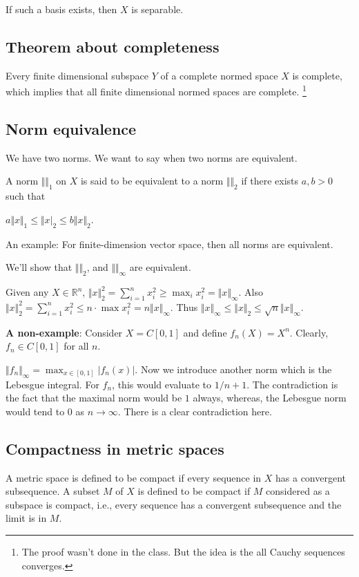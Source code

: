 \documentclass[11pt]{article}
\def\R{\mathbb{R}}
\begin{document}
If such a basis exists, then \(X\) is separable.
\subsection{Theorem about completeness}
\label{sec:org27fa49e}
Every finite dimensional subspace \(Y\) of a complete normed space \(X\) is
complete, which implies that all finite dimensional normed spaces are
complete. \footnote{The proof wasn't done in the class. But the idea is the all Cauchy
sequences converges.}
\subsection{Norm equivalence}
\label{sec:org42c378b}
We have two norms. We want to say when two norms are equivalent.

A norm \(\Vert \Vert_1\) on \(X\) is said to be equivalent to a norm \(\Vert
   \Vert_2\) if there exists \(a, b > 0\) such that

\(a \Vert x \Vert_1 \le \Vert x \vert_2 \le b \Vert x \Vert_2\).

An example: For finite-dimension vector space, then all norms are equivalent.

We'll show that \(\Vert \Vert_2\), and \(\Vert \Vert_\infty\) are equivalent.

Given any \(X \in \R^n\), \(\Vert x\Vert_2^2 = \sum_{i=1}^{n} x_i^2 \ge \max_i
   x_i^2 = \Vert x\Vert_\infty\). Also \(\Vert x \Vert_2^2 = \sum_{i=1}^{n} x_i^2
   \le n \cdot \max x_i^2 = n \Vert x \Vert_\infty\). Thus \(\Vert x \Vert_\infty
   \le \Vert x\Vert_2 \le \sqrt{n}\Vert x \Vert_\infty\).

\textbf{A non-example}: Consider \(X = C[0, 1]\) and define \(f_n(X) = X^n\). Clearly,
\(f_n \in C[0, 1]\) for all \(n\).

\(\Vert f_n \Vert_\infty = \max_{x\in [0, 1]} \vert f_n(x)\vert\). Now we
introduce another norm which is the Lebesgue integral. For \(f_n\), this would
evaluate to \(1/{n+1}\). The contradiction is the fact that the maximal norm
would be \(1\) always, whereas, the Lebesgue norm would tend to \(0\) as
\(n\rightarrow \infty\). There is a clear contradiction here.
\subsection{Compactness in metric spaces}
\label{sec:orgae819b0}
A metric space is defined to be compact if every sequence in \(X\) has a
convergent subsequence. A subset \(M\) of \(X\) is defined to be compact if \(M\)
considered as a subspace is compact, i.e., every sequence has a convergent
subsequence and the limit is in \(M\).
\end{document}
